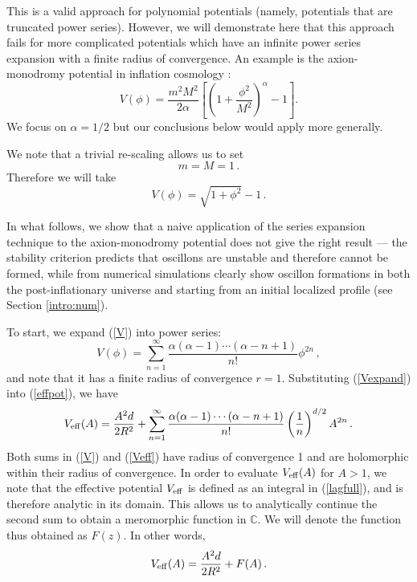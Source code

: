\documentclass[11pt]{book}
\begin{document}
This is a valid approach for polynomial potentials (namely, potentials that are truncated power series). However, we will demonstrate here that this approach fails for more complicated potentials which have an infinite power series expansion with a finite radius of convergence. An example is the axion-monodromy potential in inflation cosmology \cite{stringInflationBook, McAllister:2008hb}:
\begin{equation}
  V(\phi) = \frac{m^2M^2}{2\alpha}\left[\left(1+\frac{\phi^2}{M^2}\right)^\alpha-1\right].
\end{equation}
We focus on $\alpha=1/2$ but our conclusions below would apply more generally.

We note that a trivial re-scaling allows us to set
\begin{equation}
  m=M=1\,.
\end{equation}
Therefore we will take
\begin{equation}\label{V}
  V(\phi)=\sqrt{1+\phi^2}-1\,.
\end{equation}

In what follows, we show that a naive application of the series expansion technique to the axion-monodromy potential does not give the right result --- the stability criterion predicts that oscillons are unstable and therefore cannot be formed, while from numerical simulations clearly show oscillon formations in both the post-inflationary universe and starting from an initial localized profile (see Section \ref{intro:num}).

To start, we expand (\ref{V}) into power series:
\begin{equation}\label{Vexpand}
  V(\phi)=\sum_{n=1}^\infty\frac{\alpha(\alpha-1)\cdots(\alpha-n+1)}{n!}\phi^{2n}\,,
\end{equation}
and note that it has a finite radius of convergence $r=1$. Substituting (\ref{Vexpand}) into (\ref{effpot}), we have
\begin{equation}\label{Veff}
  V_{\rm eff}(A)=\frac{A^2d}{2R^2} + \sum_{n=1}^\infty\frac{\alpha(\alpha-1)\cdots(\alpha-n+1)}{n!}
  \left(\frac{1}{n}\right)^{d/2}A^{2n}\,.
\end{equation}
Both sums in (\ref{V}) and (\ref{Veff}) have radius of convergence 1 and are holomorphic within their radius of convergence. In order to evaluate $V_{\rm eff}(A)$ for $A>1$, we note that the effective potential $V_{\rm eff}$ is defined as an integral in (\ref{lagfull}), and is therefore analytic in its domain. This allows us to analytically continue the second sum to obtain a meromorphic function in $\mathbb{C}$. We will denote the function thus obtained as $F(z)$. In other words,
\begin{equation}\label{VeffFz}
  V_{\rm eff}(A) = \frac{A^2d}{2R^2} + F(A)\,.
\end{equation}
\end{document}
